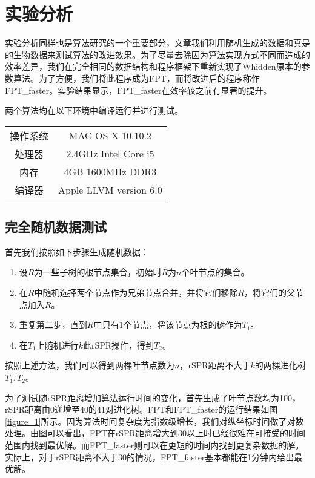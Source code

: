 
\chapter{实验分析}

实验分析同样也是算法研究的一个重要部分，文章我们利用随机生成的数据和真是的生物数据来测试算法的改进效果。为了尽量去除因为算法实现方式不同而造成的效率差异，我们在完全相同的数据结构和程序框架下重新实现了Whidden原本的参数算法。为了方便，我们将此程序成为FPT，而将改进后的程序称作FPT\_faster。实验结果显示，FPT\_faster在效率较之前有显著的提升。

两个算法均在以下环境中编译运行并进行测试。
\begin{center}
\begin{tabular}{ c c }
	\hline
  操作系统 & MAC OS X 10.10.2  \\
  处理器 & 2.4GHz Intel Core i5  \\
  内存 & 4GB 1600MHz DDR3  \\
  编译器 & Apple LLVM version 6.0 \\
	\hline
\end{tabular}
\end{center}

\section{完全随机数据测试}

首先我们按照如下步骤生成随机数据：
\begin{enumerate}
	\item 设$R$为一些子树的根节点集合，初始时$R$为$n$个叶节点的集合。
	\item 在$R$中随机选择两个节点作为兄弟节点合并，并将它们移除$R$，将它们的父节点加入$R$。
	\item 重复第二步，直到$R$中只有$1$个节点，将该节点为根的树作为$T_1$。
	\item 在$T_1$上随机进行$k$此rSPR操作，得到$T_2$。
\end{enumerate}

按照上述方法，我们可以得到两棵叶节点数为$n$，rSPR距离不大于$k$的两棵进化树$T_1,T_2$。

为了测试随rSPR距离增加算法运行时间的变化，首先生成了叶节点数均为100，rSPR距离由0递增至40的41对进化树。FPT和FPT\_faster的运行结果如图\ref{figure_1}所示。因为算法时间复杂度为指数级增长，我们对纵坐标时间做了对数处理。由图可以看出，FPT在rSPR距离增大到30以上时已经很难在可接受的时间范围内找到最优解。而FPT\_faster则可以在更短的时间内找到更复杂数据的解。实际上，对于rSPR距离不大于30的情况，FPT\_faster基本都能在1分钟内给出最优解。

